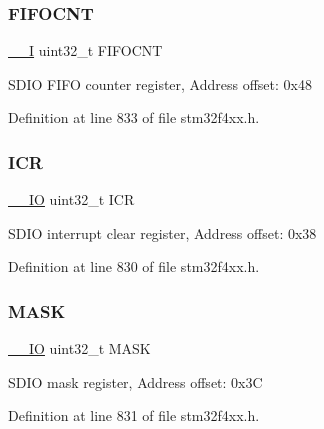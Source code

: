 \subsubsection{\texorpdfstring{F\+I\+F\+O\+C\+NT}{FIFOCNT}}
{\footnotesize\ttfamily \hyperlink{group___c_m_s_i_s__core__definitions_gaf63697ed9952cc71e1225efe205f6cd3}{\+\_\+\+\_\+I} uint32\+\_\+t F\+I\+F\+O\+C\+NT}

S\+D\+IO F\+I\+FO counter register, Address offset\+: 0x48 

Definition at line 833 of file stm32f4xx.\+h.

\mbox{\label{struct_s_d_i_o___type_def_a0a8c8230846fd8ff154b9fde8dfa0399}} 
\subsubsection{\texorpdfstring{I\+CR}{ICR}}
{\footnotesize\ttfamily \hyperlink{group___c_m_s_i_s__core__definitions_gaec43007d9998a0a0e01faede4133d6be}{\+\_\+\+\_\+\+IO} uint32\+\_\+t I\+CR}

S\+D\+IO interrupt clear register, Address offset\+: 0x38 

Definition at line 830 of file stm32f4xx.\+h.

\mbox{\label{struct_s_d_i_o___type_def_a5c955643593b4aedbe9f84f054d26522}} 
\subsubsection{\texorpdfstring{M\+A\+SK}{MASK}}
{\footnotesize\ttfamily \hyperlink{group___c_m_s_i_s__core__definitions_gaec43007d9998a0a0e01faede4133d6be}{\+\_\+\+\_\+\+IO} uint32\+\_\+t M\+A\+SK}

S\+D\+IO mask register, Address offset\+: 0x3C 

Definition at line 831 of file stm32f4xx.\+h.

\mbox{\label{struct_s_d_i_o___type_def_a65bff76f3af24c37708a1006d54720c7}} 

